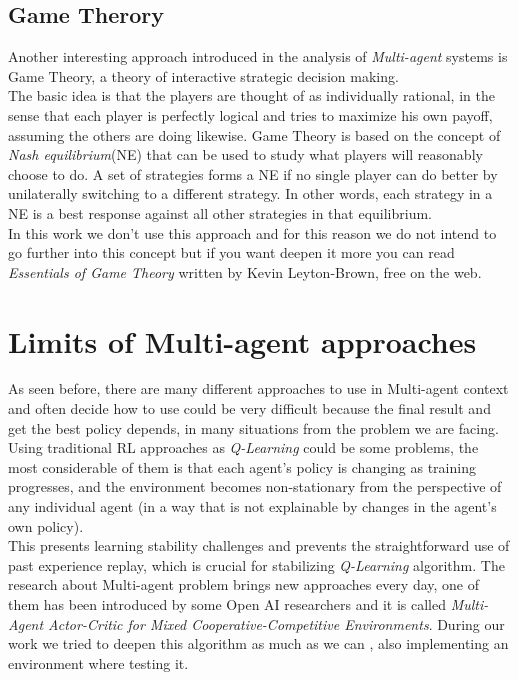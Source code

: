 \documentclass[]{report}
\begin{document}
\subsection{Game Therory}
Another interesting approach introduced in the analysis of \emph{Multi-agent} systems is Game Theory, a theory of interactive strategic decision making.\\
The basic idea is that the players are thought of as individually rational, in the sense that each player is perfectly logical and tries to maximize his own payoff, assuming the others are doing likewise.
Game Theory is based on the concept of \emph{Nash equilibrium}(NE) that can be used to study what players will reasonably choose to do. A set of strategies forms a NE if no single player can do better by unilaterally switching to a different strategy. In other words, each strategy in a NE is a best response against all other strategies in that equilibrium.\\
In this work we don't use this approach and for this reason we do not intend to go further into this concept but if you want deepen it more you can read \emph{Essentials of Game Theory} written by Kevin Leyton-Brown, free on the web.

\section{Limits of Multi-agent approaches}
As seen before, there are many different approaches to use in Multi-agent context and often decide how to use could be very difficult because the final result and get the best policy depends, in many situations from the problem we are facing.\\
Using traditional RL approaches as \emph{Q-Learning} could be some problems, the most considerable of them is that each agent’s policy is changing as training progresses, and the environment becomes non-stationary from the perspective of any individual agent (in a way that is not explainable by changes in the agent’s own policy).\\
This presents learning stability challenges and prevents the straightforward use of past experience replay, which is crucial for stabilizing \emph{Q-Learning} algorithm.
The research about Multi-agent problem brings new approaches every day, one of them has been introduced by some Open AI researchers and it is called \emph{Multi-Agent Actor-Critic for Mixed Cooperative-Competitive Environments}.
During our work we tried to deepen this algorithm as much as we can , also implementing an environment where testing it.
\end{document}
